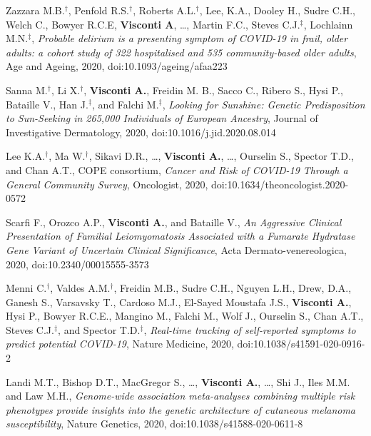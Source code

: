 \documentclass[a4paper,10pt]{article}
\begin{document}
{\begin{itemize}
		 Zazzara M.B.$^{\textbf{$\dag $}}$, Penfold R.S.$^{\textbf{$\dag $}}$, Roberts A.L.$^{\textbf{$\dag $}}$, Lee, K.A., Dooley H., Sudre C.H., Welch C., Bowyer R.C.E, \textbf{Visconti A}, \dots, Martin F.C., Steves C.J.$^{\textbf{$\ddag $}}$, Lochlainn M.N.$^{\textbf{$\ddag $}}$, \emph{Probable delirium is a presenting symptom of COVID-19 in frail, older adults: a cohort study of 322 hospitalised and 535 community-based older adults}, Age and Ageing, 2020, doi:10.1093/ageing/afaa223
		
		 Sanna M.$^{\textbf{$\dag $}}$, Li X.$^{\textbf{$\dag $}}$, \textbf{Visconti A.}, Freidin M. B., Sacco C., Ribero S., Hysi P., Bataille V., Han J.$^{\textbf{$\ddag $}}$, and Falchi M.$^{\textbf{$\ddag $}}$, \emph{Looking for Sunshine: Genetic Predisposition to Sun-Seeking in 265,000 Individuals of European Ancestry}, Journal of Investigative Dermatology, 2020, doi:10.1016/j.jid.2020.08.014

		 Lee K.A.$^{\textbf{$\dag $}}$, Ma W.$^{\textbf{$\dag $}}$, Sikavi D.R., \dots, \textbf{Visconti A.}, \dots, Ourselin S., Spector T.D., and Chan A.T., COPE consortium, \emph{Cancer and Risk of COVID-19 Through a General Community Survey}, Oncologist, 2020, doi:10.1634/theoncologist.2020-0572

		 Scarfi F., Orozco A.P., \textbf{Visconti A.}, and Bataille V., \emph{An Aggressive Clinical Presentation of Familial Leiomyomatosis Associated with a Fumarate Hydratase Gene Variant of Uncertain Clinical Significance}, Acta Dermato-venereologica, 2020, doi:10.2340/00015555-3573

		 Menni C.$^{\textbf{$\dag $}}$, Valdes A.M.$^{\textbf{$\dag $}}$, Freidin M.B., Sudre C.H., Nguyen L.H., Drew, D.A., Ganesh S., Varsavsky T., Cardoso M.J., El-Sayed Moustafa J.S., \textbf{Visconti A.}, Hysi P., Bowyer R.C.E., Mangino M., Falchi M., Wolf J., Ourselin S., Chan A.T., Steves C.J.$^{\textbf{$\ddag $}}$, and Spector T.D.$^{\textbf{$\ddag $}}$, \emph{Real-time tracking of self-reported symptoms to predict potential COVID-19}, Nature Medicine, 2020, doi:10.1038/s41591-020-0916-2

		 Landi M.T., Bishop D.T., MacGregor S., \dots, \textbf{Visconti A.}, \dots, Shi J., Iles M.M. and Law M.H., \emph{Genome-wide association meta-analyses combining multiple risk phenotypes provide insights into the genetic architecture of cutaneous melanoma susceptibility}, Nature Genetics, 2020, doi:10.1038/s41588-020-0611-8


\end{itemize}}
\end{document}
